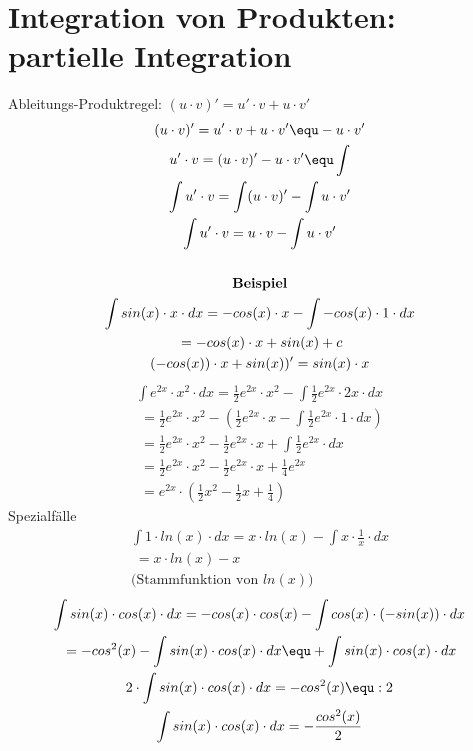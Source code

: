 \section{Integration von Produkten: partielle Integration}
Ableitungs-Produktregel: $(u \cdot v)' = u' \cdot v + u \cdot v'$
\begin{gather*}
  (u \cdot v)' = u' \cdot v + u \cdot v' \equ - u \cdot v' \\
  u' \cdot v = (u \cdot v)' - u \cdot v' \equ \int \\
  \int u' \cdot v = \int (u \cdot v)' - \int u \cdot v' \\
  \int u' \cdot v = u \cdot v - \int u \cdot v' \\\\
  \textbf{Beispiel} \\
  \int sin(x) \cdot x \cdot dx = -cos(x) \cdot x - \int -cos(x) \cdot 1 \cdot dx \\
  \;= -cos(x) \cdot x + sin(x) + c \\
  (-cos(x)) \cdot x + sin(x))' = sin(x) \cdot x
\end{gather*}
\begin{gather*}
  \int e^{2x} \cdot x^2 \cdot dx = \frac{1}{2}e^{2x} \cdot x^2 - \int \frac{1}{2}e^{2x} \cdot 2x \cdot dx \\
  \;= \frac{1}{2}e^{2x} \cdot x^2 - (\frac{1}{2}e^{2x} \cdot x - \int \frac{1}{2}e^{2x} \cdot 1 \cdot dx) \\
  \;= \frac{1}{2}e^{2x} \cdot x^2 - \frac{1}{2}e^{2x} \cdot x + \int \frac{1}{2}e^{2x} \cdot dx \\
  \;= \frac{1}{2}e^{2x} \cdot x^2 - \frac{1}{2}e^{2x} \cdot x + \frac{1}{4}e^{2x} \\
  \;= e^{2x} \cdot (\frac{1}{2}x^2 - \frac{1}{2}x + \frac{1}{4})
\end{gather*}
Spezialfälle
\begin{gather*}
  \int 1 \cdot ln(x) \cdot dx = x \cdot ln(x) - \int x \cdot \frac{1}{x} \cdot dx \\
  \;= x \cdot ln(x) - x \\
  \text{(Stammfunktion von $ln(x)$)}
\end{gather*}
\begin{gather*}
  \int sin(x) \cdot cos(x) \cdot dx = -cos(x) \cdot cos(x) - \int cos(x) \cdot (-sin(x)) \cdot dx \\
  \;= -cos^2(x) - \int sin(x) \cdot cos(x) \cdot dx \equ + \int sin(x) \cdot cos(x) \cdot dx \\
  2 \cdot \int sin(x) \cdot cos(x) \cdot dx = -cos^2(x) \equ : 2 \\
  \int sin(x) \cdot cos(x) \cdot dx = -\frac{cos^2(x)}{2}
\end{gather*}
